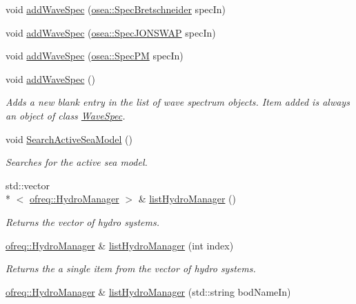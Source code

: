 \begin{DoxyCompactItemize}
void \hyperlink{classosea_1_1ofreq_1_1_system_ab06d4748db31d3e3870aa772a6ae9a64}{add\-Wave\-Spec} (\hyperlink{classosea_1_1_spec_bretschneider}{osea\-::\-Spec\-Bretschneider} spec\-In)
\item 
void \hyperlink{classosea_1_1ofreq_1_1_system_af21d13c02036924ca85105e83fc53b73}{add\-Wave\-Spec} (\hyperlink{classosea_1_1_spec_j_o_n_s_w_a_p}{osea\-::\-Spec\-J\-O\-N\-S\-W\-A\-P} spec\-In)
\item 
void \hyperlink{classosea_1_1ofreq_1_1_system_adfef98a402da2c1ef56d7cb7a50b2461}{add\-Wave\-Spec} (\hyperlink{classosea_1_1_spec_p_m}{osea\-::\-Spec\-P\-M} spec\-In)
\item 
void \hyperlink{classosea_1_1ofreq_1_1_system_a7e134e538c03e599906a393fca749b08}{add\-Wave\-Spec} ()
\begin{DoxyCompactList}\small\item\em Adds a new blank entry in the list of wave spectrum objects. Item added is always an object of class \hyperlink{classosea_1_1_wave_spec}{Wave\-Spec}. \end{DoxyCompactList}\item 
void \hyperlink{classosea_1_1ofreq_1_1_system_aa6491aee03c8ecb67dea910f1c753bf5}{Search\-Active\-Sea\-Model} ()
\begin{DoxyCompactList}\small\item\em Searches for the active sea model. \end{DoxyCompactList}\item 
std\-::vector\\*
$<$ \hyperlink{classosea_1_1ofreq_1_1_hydro_manager}{ofreq\-::\-Hydro\-Manager} $>$ \& \hyperlink{classosea_1_1ofreq_1_1_system_ac7d874084878cc52c017d1ec22d6ee2c}{list\-Hydro\-Manager} ()
\begin{DoxyCompactList}\small\item\em Returns the vector of hydro systems. \end{DoxyCompactList}\item 
\hyperlink{classosea_1_1ofreq_1_1_hydro_manager}{ofreq\-::\-Hydro\-Manager} \& \hyperlink{classosea_1_1ofreq_1_1_system_a04a47bdb383b302b7442cf1d0f6f831d}{list\-Hydro\-Manager} (int index)
\begin{DoxyCompactList}\small\item\em Returns the a single item from the vector of hydro systems. \end{DoxyCompactList}\item 
\hyperlink{classosea_1_1ofreq_1_1_hydro_manager}{ofreq\-::\-Hydro\-Manager} \& \hyperlink{classosea_1_1ofreq_1_1_system_ab3048e1b5ec6b5a6bd3b7aedd6cb256d}{list\-Hydro\-Manager} (std\-::string bod\-Name\-In)

\end{DoxyCompactItemize}

